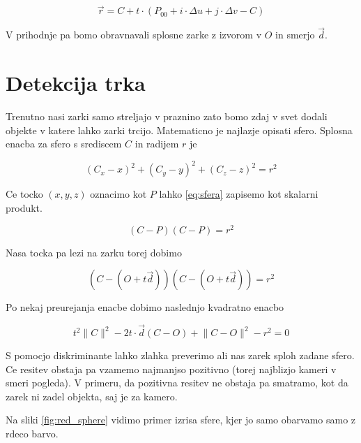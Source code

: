 \documentclass[12pt, a4paper]{article}
\begin{document}
\begin{equation}
	\vec{r} = C + t \cdot (P_{00} + i \cdot \Delta u + j \cdot \Delta v - C)
\end{equation}

V prihodnje pa bomo obravnavali splosne zarke z izvorom v $O$ in smerjo $\vec{d}$.

\section{Detekcija trka}

Trenutno nasi zarki samo streljajo v praznino zato bomo zdaj v svet dodali objekte v katere lahko zarki trcijo.
Matematicno je najlazje opisati sfero. Splosna enacba za sfero s srediscem $C$ in radijem $r$ je

\begin{equation}
	\label{eq:sfera}
	(C_{x} - x)^2  + (C_{y} - y)^2  + (C_{z} - z)^2  = r^2
\end{equation}

Ce tocko $(x,y,z)$ oznacimo kot $P$ lahko \ref{eq:sfera} zapisemo kot skalarni produkt.

\begin{equation}
	(C - P)(C - P) = r^2
\end{equation}

Nasa tocka pa lezi na zarku torej dobimo

\begin{equation}
	(C - (O + t \vec{d}))(C - (O + t \vec{d})) = r^2
\end{equation}

Po nekaj preurejanja enacbe dobimo naslednjo kvadratno enacbo

\begin{equation}
	t^2 \lVert C \rVert ^2  - 2 t \cdot \vec{d} (C - O) + \lVert C - O \rVert ^2  - r^2 = 0
\end{equation}

S pomocjo diskriminante lahko zlahka preverimo ali nas zarek sploh zadane sfero. Ce resitev obstaja pa vzamemo
najmanjso pozitivno (torej najblizjo kameri v smeri pogleda). V primeru, da pozitivna resitev ne obstaja pa
smatramo, kot da zarek ni zadel objekta, saj je za kamero.

Na sliki \ref{fig:red_sphere} vidimo primer izrisa sfere, kjer jo samo obarvamo samo z rdeco barvo.
\end{document}
